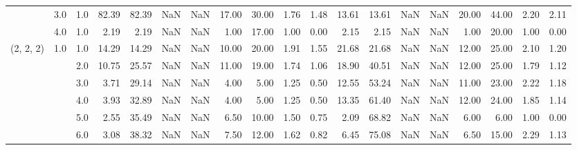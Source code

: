 \begin{tabular}{lllrrrrrrrrrrrrrrrr}
          & 3.0 & 1.0  &     82.39 &      82.39 &               NaN &                NaN & 17.00 &  30.00 &             1.76 &                         1.48 &     13.61 &      13.61 &               NaN &                NaN & 20.00 &  44.00 &             2.20 &                         2.11 \\
          & 4.0 & 1.0  &      2.19 &       2.19 &               NaN &                NaN &  1.00 &  17.00 &             1.00 &                         0.00 &      2.15 &       2.15 &               NaN &                NaN &  1.00 &  20.00 &             1.00 &                         0.00 \\
(2, 2, 2) & 1.0 & 1.0  &     14.29 &      14.29 &               NaN &                NaN & 10.00 &  20.00 &             1.91 &                         1.55 &     21.68 &      21.68 &               NaN &                NaN & 12.00 &  25.00 &             2.10 &                         1.20 \\
          &     & 2.0  &     10.75 &      25.57 &               NaN &                NaN & 11.00 &  19.00 &             1.74 &                         1.06 &     18.90 &      40.51 &               NaN &                NaN & 12.00 &  25.00 &             1.79 &                         1.12 \\
          &     & 3.0  &      3.71 &      29.14 &               NaN &                NaN &  4.00 &   5.00 &             1.25 &                         0.50 &     12.55 &      53.24 &               NaN &                NaN & 11.00 &  23.00 &             2.22 &                         1.18 \\
          &     & 4.0  &      3.93 &      32.89 &               NaN &                NaN &  4.00 &   5.00 &             1.25 &                         0.50 &     13.35 &      61.40 &               NaN &                NaN & 12.00 &  24.00 &             1.85 &                         1.14 \\
          &     & 5.0  &      2.55 &      35.49 &               NaN &                NaN &  6.50 &  10.00 &             1.50 &                         0.75 &      2.09 &      68.82 &               NaN &                NaN &  6.00 &   6.00 &             1.00 &                         0.00 \\
          &     & 6.0  &      3.08 &      38.32 &               NaN &                NaN &  7.50 &  12.00 &             1.62 &                         0.82 &      6.45 &      75.08 &               NaN &                NaN &  6.50 &  15.00 &             2.29 &                         1.13 \\

\end{tabular}
